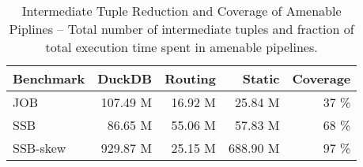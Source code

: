 \begin{table}[!t]
	\centering 
	\caption{Intermediate Tuple Reduction and Coverage of Amenable Piplines -- Total number of intermediate tuples and fraction of total execution time spent in amenable pipelines.}
	\vspace{-0.3cm} \setlength\tabcolsep{5pt}
	\begin{tabular}{lrrrr}
		\toprule
		\textbf{Benchmark} & \textbf{DuckDB} & \textbf{Routing} & \textbf{Static} & \textbf{Coverage}\\
		\midrule
		JOB &     107.49 M &      16.92 M &      25.84 M & 37 \%\\
		SSB &      86.65 M &      55.06 M &      57.83 M & 68 \%\\
		SSB-skew &     929.87 M &      25.15 M &     688.90 M & 97 \%\\
		\bottomrule
	\end{tabular}
	\label{tab:1_2_potential_savings}
\end{table}
